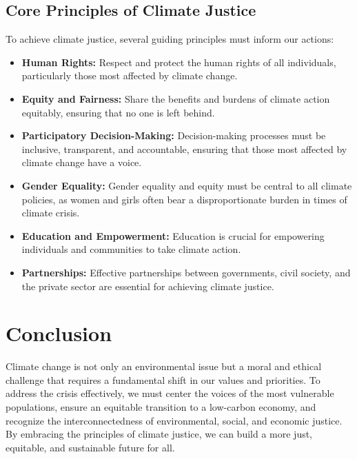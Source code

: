 \documentclass[12pt]{article}
\begin{document}
\subsection{Core Principles of Climate Justice}

To achieve climate justice, several guiding principles must inform our actions:

\begin{itemize}
    \item \textbf{Human Rights:} Respect and protect the human rights of all individuals, particularly those most affected by climate change.
    
    \item \textbf{Equity and Fairness:} Share the benefits and burdens of climate action equitably, ensuring that no one is left behind.
    
    \item \textbf{Participatory Decision-Making:} Decision-making processes must be inclusive, transparent, and accountable, ensuring that those most affected by climate change have a voice.
    
    \item \textbf{Gender Equality:} Gender equality and equity must be central to all climate policies, as women and girls often bear a disproportionate burden in times of climate crisis.
    
    \item \textbf{Education and Empowerment:} Education is crucial for empowering individuals and communities to take climate action.
    
    \item \textbf{Partnerships:} Effective partnerships between governments, civil society, and the private sector are essential for achieving climate justice.
\end{itemize}

\section{Conclusion}

Climate change is not only an environmental issue but a moral and ethical challenge that requires a fundamental shift in our values and priorities. To address the crisis effectively, we must center the voices of the most vulnerable populations, ensure an equitable transition to a low-carbon economy, and recognize the interconnectedness of environmental, social, and economic justice. By embracing the principles of climate justice, we can build a more just, equitable, and sustainable future for all.
\end{document}
